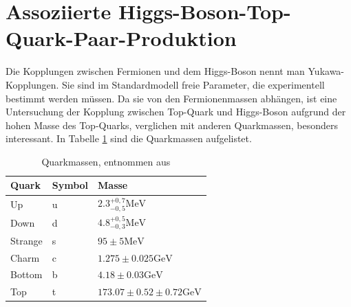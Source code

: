 \section{Assoziierte Higgs-Boson-Top-Quark-Paar-Produktion}
\label{ch:Theorie:sec:ttH}

Die Kopplungen zwischen Fermionen und dem Higgs-Boson nennt man Yukawa-Kopplungen.
Sie sind im Standardmodell freie Parameter, die experimentell bestimmt werden m\"ussen. Da sie von den Fermionenmassen abh\"angen, ist eine Untersuchung der Kopplung zwischen Top-Quark und Higgs-Boson aufgrund der hohen Masse des Top-Quarks, verglichen mit anderen Quarkmassen, besonders interessant. In Tabelle \ref{tab:quarkmasse} sind die Quarkmassen aufgelistet.\\

\begin{table}[tbp]\parbox{12cm}{
  \caption[Quarkmassen]{Quarkmassen, entnommen aus {\rm \cite{Agashe:2014kda}}
  }\label{tab:quarkmasse}}
  \begin{center}
  \begin{tabular}{lll}
  \hline
  {\bf Quark} & {\bf Symbol} & {\bf Masse}  \\
  \hline \hline
     Up		& u & $\num{2,3}^{{+0,7}}_{{-0,5}}\si{\mega\electronvolt}$ \\
     Down	& d & $\num{4,8}^{{+0,5}}_{{-0,3}}\si{\mega\electronvolt}$ \\
     Strange& s & $\num{95}\pm \num{5}\si{\mega\electronvolt}$ \\
     Charm	& c & $\num{1,275}\pm \num{0,025}\si{\giga\electronvolt}$ \\ 
  	 Bottom & b & $\num{4,18}\pm \num{0,03}\si{\giga\electronvolt}$ \\
     Top    & t & $\num{173,07}\pm \num{0,52}\pm \num{0,72}\si{\giga\electronvolt}$\\                                
  \hline
  \end{tabular}
  \end{center}
\end{table}

